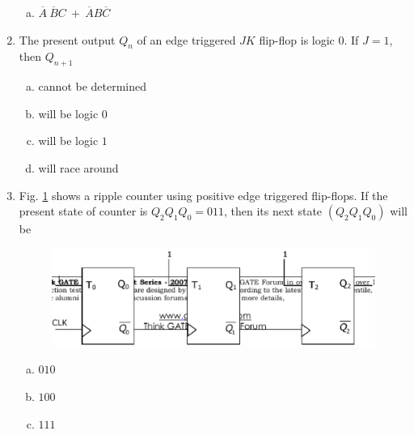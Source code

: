 \documentclass[journal,12pt,twocolumn]{IEEEtran}
\begin{document}
\begin{enumerate}
\begin{enumerate}[(a)]
\item $ \overline{A} \ \overline{B}C \ + \ \overline{A}B\overline{C} $

\end{enumerate}

\item The present output $Q_n$ of an edge triggered $JK$ flip-flop is logic $0$. If $J=1$, then $Q_{n+1}$

\begin{enumerate}[(a)]
 
\item cannot be determined

\item will be logic $0$

\item will be logic $1$

\item will race around

\end{enumerate}


\item Fig.  \ref{fig:25} shows a ripple counter using positive edge triggered flip-flops. If the present state of counter is $Q_2Q_1Q_0=011$, then its next state $(Q_2Q_1Q_0)$ will be


\begin{figure}

\centering

\includegraphics[width=\columnwidth]{./figs/29.eps}

\caption{}

\label{fig:25}

\end{figure} 



\begin{enumerate}[(a)]
 
\item $
010
$

\item $
100
$

\item $
111
$


\end{enumerate}
\end{enumerate}
\end{document}
